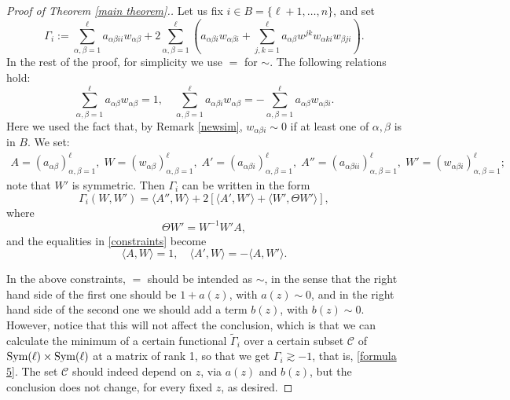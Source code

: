 \documentclass[12pt]{amsart}
\newcommand{\1}{\mathbf 1}
\newcommand{\symm}{\mbox{\rm Sym}}
\begin{document}
\begin{proof}[Proof of Theorem \ref{main theorem}.]
Let us fix $i\in B=\{\ell+1,\dots,n\}$, and set
$$
\Gamma_i:=\sum_{\alpha,\beta=1}^\ell a_{\alpha\beta ii}w_{\alpha\beta}+2\sum_{\alpha,\beta=1}^\ell
\left(a_{\alpha\beta i}w_{\alpha\beta i}+\sum_{j,k=1}^\ell a_{\alpha\beta}w^{jk}w_{\alpha ki}w_{\beta ji}
\right).
$$
In the rest of the proof, for simplicity we use $=$ for $\sim$. The following relations hold:
\begin{equation}\label{constraints}
\sum_{\alpha,\beta=1}^\ell a_{\alpha\beta} w_{\alpha\beta}=1,\quad\sum_{\alpha,\beta=1}^\ell a_{\alpha\beta i}w_{\alpha\beta}= -\sum_{\alpha,\beta=1}^\ell a_{\alpha\beta}w_{\alpha\beta i}.
\end{equation}
Here we used the fact that, by Remark \ref{newsim}, $w_{\alpha\beta i}\sim 0$ if at least one of $\alpha, \beta$ is in $B$. We set:
\begin{eqnarray*}
A=(a_{\alpha\beta})_{\alpha,\beta=1}^\ell,\; W=(w_{\alpha\beta})_{\alpha,\beta=1}^\ell,\; A'=(a_{\alpha\beta i})_{\alpha,\beta=1}^\ell,\;A''=(a_{\alpha\beta ii})_{\alpha,\beta=1}^\ell,\; W'=(w_{\alpha\beta i})_{\alpha,\beta=1}^\ell;
\end{eqnarray*}
note that $W'$ is symmetric. Then $\Gamma_i$ can be written in the form
\begin{equation}\label{bilinear}
\Gamma_i(W,W')=\langle A'', W\rangle+2\left[\langle A',W'\rangle+\langle W',\Theta W'\rangle\right],
\end{equation}
where
$$
\Theta W'=W^{-1}W' A,
$$
and the equalities in \eqref{constraints} become
\begin{equation}\label{dubbio}
\langle A,W\rangle=1,\quad \langle A',W\rangle=-\langle A,W'\rangle.
\end{equation}

In the above constraints, $=$ should be intended as $\sim$, in the sense that the right hand side of the first one should be $1+a(z)$, with $a(z)\sim 0$, and in the right hand side of the second one we should add a term $b(z)$, with $b(z)\sim 0$. However, notice that this will not affect the conclusion, which is that we can calculate the minimum of a certain functional $\tilde\Gamma_i$ over a certain subset $\mathcal C$ of $\symm(\ell)\times\symm(\ell)$ at a matrix of rank 1, so that we get $\Gamma_i\gtrsim -1$, that is, \eqref{formula 5}. The set $\mathcal C$ should indeed depend on $z$, via $a(z)$ and $b(z)$, but the conclusion does not change, for every fixed $z$, as desired.


\end{proof}
\end{document}

